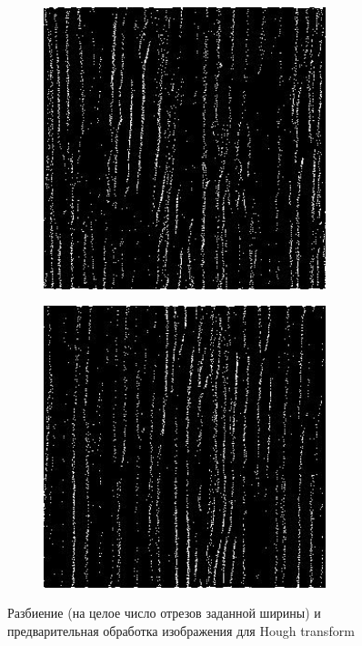 \documentclass[twocolumn,10pt,russian]{/usr/lib/python3.3/site-packages/sphinx/texinputs/sphinxhowto}
\begin{document}
\begin{figure}[h]
\begin{subfigure}{0.17\textwidth}
	 	   \includegraphics[width = 0.9\textwidth]{PIL_Test_files/PIL_Test_28_0.jpeg}
	    \end{subfigure}%
	    \begin{subfigure}{0.17\textwidth}
	 	   \includegraphics[width = 0.9\textwidth]{PIL_Test_files/PIL_Test_29_0.jpeg}
	    \end{subfigure}
	    \caption{Разбиение (на целое число отрезов заданной ширины) 
	    	и предварительная обработка изображения для Hough transform}
   \end{figure}
        
\end{document}
